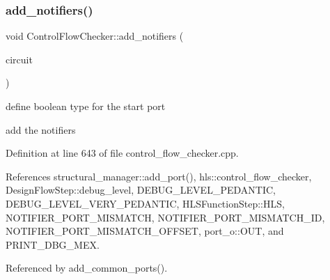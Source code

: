 \subsubsection{\texorpdfstring{add\+\_\+notifiers()}{add\_notifiers()}}
{\footnotesize\ttfamily void Control\+Flow\+Checker\+::add\+\_\+notifiers (\begin{DoxyParamCaption}\item[{\hyperlink{structural__objects_8hpp_a8ea5f8cc50ab8f4c31e2751074ff60b2}{structural\+\_\+object\+Ref}}]{circuit }\end{DoxyParamCaption})\hspace{0.3cm}{\ttfamily [protected]}}

define boolean type for the start port

add the notifiers 

Definition at line 643 of file control\+\_\+flow\+\_\+checker.\+cpp.



References structural\+\_\+manager\+::add\+\_\+port(), hls\+::control\+\_\+flow\+\_\+checker, Design\+Flow\+Step\+::debug\+\_\+level, D\+E\+B\+U\+G\+\_\+\+L\+E\+V\+E\+L\+\_\+\+P\+E\+D\+A\+N\+T\+IC, D\+E\+B\+U\+G\+\_\+\+L\+E\+V\+E\+L\+\_\+\+V\+E\+R\+Y\+\_\+\+P\+E\+D\+A\+N\+T\+IC, H\+L\+S\+Function\+Step\+::\+H\+LS, N\+O\+T\+I\+F\+I\+E\+R\+\_\+\+P\+O\+R\+T\+\_\+\+M\+I\+S\+M\+A\+T\+CH, N\+O\+T\+I\+F\+I\+E\+R\+\_\+\+P\+O\+R\+T\+\_\+\+M\+I\+S\+M\+A\+T\+C\+H\+\_\+\+ID, N\+O\+T\+I\+F\+I\+E\+R\+\_\+\+P\+O\+R\+T\+\_\+\+M\+I\+S\+M\+A\+T\+C\+H\+\_\+\+O\+F\+F\+S\+ET, port\+\_\+o\+::\+O\+UT, and P\+R\+I\+N\+T\+\_\+\+D\+B\+G\+\_\+\+M\+EX.



Referenced by add\+\_\+common\+\_\+ports().

